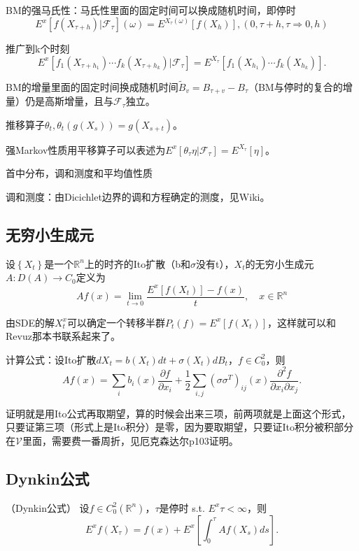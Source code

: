 BM的强马氏性：马氏性里面的固定时间可以换成随机时间，即停时\[
  E^x[f(X_{\tau + h}) | \mathcal{F}_\tau](\omega) = E^{X_\tau(\omega)}[f(X_h)], (0, \tau + h, \tau \Rightarrow 0, h)
\]

推广到k个时刻
\[
  E^{x}\left[f_{1}\left(X_{\tau+h_{1}}\right) \cdots f_{k}\left(X_{\tau+h_{k}}\right) | \mathcal{F}_{\tau}\right] = E^{X_{\tau}}\left[f_{1}\left(X_{h_{1}}\right) \cdots f_{k}\left(X_{h_{k}}\right)\right] .
\]

BM的增量里面的固定时间换成随机时间$\widetilde{B}_v = B_{\tau + v} - B_\tau$（BM与停时的复合的增量）仍是高斯增量，且与$\mathcal{F}_\tau$独立。

推移算子$\theta_t, \theta_t(g(X_s)) = g(X_{s + t})$。

强Markov性质用平移算子可以表述为$E^{x}\left[\theta_{\tau} \eta | \mathcal{F}_{\tau}\right]=E^{X_{\tau}}[\eta]$。

首中分布，调和测度和平均值性质

调和测度：由Dicichlet边界的调和方程确定的测度，见Wiki。

\subsection{无穷小生成元}

设$\left\{X_{t}\right\}$是一个$\mathbb{R}^{n}$上的时齐的Ito扩散（b和$\sigma$没有t），$X_{t}$的无穷小生成元$A: D(A) \to C_0$定义为
\[
  A f(x)=\lim _{t \rightarrow 0} \frac{E^{x}\left[f\left(X_{t}\right)\right]-f(x)}{t}, \quad x \in \mathbb{R}^{n}
\]

由SDE的解$X_t^x$可以确定一个转移半群$P_t(f) = E^{x}\left[f\left(X_{t}\right)\right]$，这样就可以和Revuz那本书联系起来了。

计算公式：设Ito扩散$dX_t = b(X_t)dt + \sigma(X_t)dB_t$，$f \in C_0^2$，则
\[
  A f(x)=\sum_{i} b_{i}(x) \frac{\partial f}{\partial x_{i}}+\frac{1}{2} \sum_{i, j}\left(\sigma \sigma^{T}\right)_{i j}(x) \frac{\partial^{2} f}{\partial x_{i} \partial x_{j}}.
\]

证明就是用Ito公式再取期望，算的时候会出来三项，前两项就是上面这个形式，只要证第三项（形式上是Ito积分）是零，因为要取期望，只要证Ito积分被积部分在$\mathcal{V}$里面，需要费一番周折，见厄克森达尔p103证明。

\subsection{Dynkin公式}

\begin{thm}（Dynkin公式）
  设$f \in C_{0}^{2}\left(\mathbb{R}^{n}\right)$，$\tau$是停时 s.t. $E^{x} \tau<\infty$，则
  \[
    E^{x} f\left(X_{\tau}\right)=f(x)+E^{x}\left[\int_{0}^{\tau} A f\left(X_{s}\right) d s\right] .
  \]
\end{thm}

